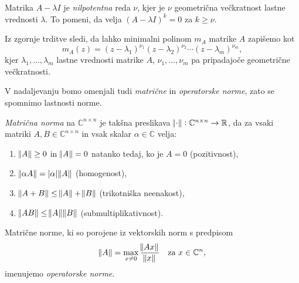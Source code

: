 \documentclass[mat1]{fmfdelo}
\newcommand{\R}{\mathbb R}
\newcommand{\C}{\mathbb C}
\begin{document}
Matrika $A - \lambda I$ je \emph{nilpotentna} reda $\nu$, kjer je $\nu$ geometrična večkratnost lastne vrednosti $\lambda$. To pomeni, da velja $(A - \lambda I)^k = 0$ za $k \geq \nu$.

Iz zgornje trditve sledi, da lahko minimalni polinom $m_A$ matrike $A$ zapišemo kot
\begin{equation*}
    m_A(z) = (z-\lambda_1)^{\nu_1}(z-\lambda_2)^{\nu_2}\cdots (z-\lambda_m)^{\nu_m},
\end{equation*}
kjer $\lambda_1, \ldots, \lambda_m$ lastne vrednosti matrike $A$, $\nu_1, \ldots, \nu_m$ pa pripadajoče geometrične večkratnosti.

V nadaljevanju bomo omenjali tudi \emph{matrične} in \emph{operatorske norme}, zato se spomnimo lastnosti norme.
\begin{definicija}
    \emph{Matrična norma} na $\C^{n \times n}$ je takšna preslikava $\norm{\cdot}: \C^{n \times n} \rightarrow \R$, da za vsaki matriki $A, B \in \C^{n \times n}$ in vsak skalar $\alpha \in \C$ velja:
    \begin{enumerate}
        \item $\norm{A} \geq 0$ in $\norm{A} = 0$ natanko tedaj, ko je $A = 0$ (pozitivnost),
        \item $\norm{\alpha A} = |\alpha|\norm{A}$ (homogenost),
        \item $\norm{A + B} \leq \norm{A} + \norm{B}$ (trikotniška neenakost), 
        \item $\norm{A B} \leq \norm{A} \norm{B}$ (submultiplikativnost).
    \end{enumerate}
    Matrične norme, ki so porojene iz vektorskih norm s predpisom
    \begin{equation*}
        \norm{A} = \max_{x \neq 0} \frac{\norm{A x}}{\norm{x}}\quad \text{za}\ x\in \C^n,
    \end{equation*}
    imenujemo \emph{operatorske norme}.
\end{definicija}
\end{document}
